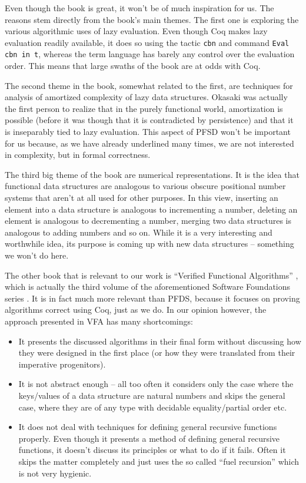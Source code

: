 \documentclass[declaration,mgr,english,shortabstract]{iithesis}
\newcommand{\m}[1]{\texttt{#1}}
\begin{document}
Even though the book is great, it won't be of much inspiration for us. The reasons stem directly from the book's main themes. The first one is exploring the various algorithmic uses of lazy evaluation. Even though Coq makes lazy evaluation readily available, it does so using the tactic \m{cbn} and command \m{Eval cbn in t}, whereas the term language has barely any control over the evaluation order. This means that large swaths of the book are at odds with Coq.

The second theme in the book, somewhat related to the first, are techniques for analysis of amortized complexity of lazy data structures. Okasaki was actually the first person to realize that in the purely functional world, amortization is possible (before it was though that it is contradicted by persistence) and that it is inseparably tied to lazy evaluation. This aspect of PFSD won't be important for us because, as we have already underlined many times, we are not interested in complexity, but in formal correctness.

The third big theme of the book are numerical representations. It is the idea that functional data structures are analogous to various obscure positional number systems that aren't at all used for other purposes. In this view, inserting an element into a data structure is analogous to incrementing a number, deleting an element is analogous to decrementing a number, merging two data structures is analogous to adding numbers and so on. While it is a very interesting and worthwhile idea, its purpose is coming up with new data structures -- something we won't do here.

The other book that is relevant to our work is ``Verified Functional Algorithms'' \cite{VFA}, which is actually the third volume of the aforementioned Software Foundations series \cite{SoftwareFoundations}. It is in fact much more relevant than PFDS, because it focuses on proving algorithms correct using Coq, just as we do. In our opinion however, the approach presented in VFA has many shortcomings:

\begin{itemize}
    \item It presents the discussed algorithms in their final form without discussing how they were designed in the first place (or how they were translated from their imperative progenitors).
    \item It is not abstract enough -- all too often it considers only the case where the keys/values of a data structure are natural numbers and skips the general case, where they are of any type with decidable equality/partial order etc.
    \item It does not deal with techniques for defining general recursive functions properly. Even though it presents a method of defining general recursive functions, it doesn't discuss its principles or what to do if it fails. Often it skips the matter completely and just uses the so called ``fuel recursion'' which is not very hygienic.
\end{itemize}
\end{document}
